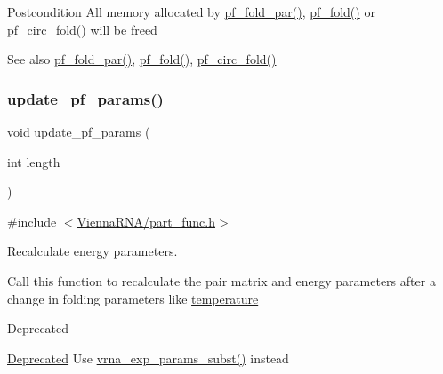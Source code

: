 \begin{DoxyPostcond}{Postcondition}
All memory allocated by \hyperlink{group__pf__fold_gac4f95bee734b2563a3d6e9932117ebdf}{pf\+\_\+fold\+\_\+par()}, \hyperlink{group__pf__fold_gadc3db3d98742427e7001a7fd36ef28c2}{pf\+\_\+fold()} or \hyperlink{group__pf__fold_ga819ce5fca8984004ac81c4a3b04cb735}{pf\+\_\+circ\+\_\+fold()} will be free\textquotesingle{}d 
\end{DoxyPostcond}
\begin{DoxySeeAlso}{See also}
\hyperlink{group__pf__fold_gac4f95bee734b2563a3d6e9932117ebdf}{pf\+\_\+fold\+\_\+par()}, \hyperlink{group__pf__fold_gadc3db3d98742427e7001a7fd36ef28c2}{pf\+\_\+fold()}, \hyperlink{group__pf__fold_ga819ce5fca8984004ac81c4a3b04cb735}{pf\+\_\+circ\+\_\+fold()} 
\end{DoxySeeAlso}
\mbox{\label{group__pf__fold_ga384e927890f9c034ff09fa66da102d28}} 
\subsubsection{\texorpdfstring{update\+\_\+pf\+\_\+params()}{update\_pf\_params()}}
{\footnotesize\ttfamily void update\+\_\+pf\+\_\+params (\begin{DoxyParamCaption}\item[{int}]{length }\end{DoxyParamCaption})}



{\ttfamily \#include $<$\hyperlink{part__func_8h}{Vienna\+R\+N\+A/part\+\_\+func.\+h}$>$}



Recalculate energy parameters. 

Call this function to recalculate the pair matrix and energy parameters after a change in folding parameters like \hyperlink{group__model__details_gab4b11c8d9c758430960896bc3fe82ead}{temperature}

\begin{DoxyRefDesc}{Deprecated}
\item[\hyperlink{deprecated__deprecated000107}{Deprecated}]Use \hyperlink{group__energy__parameters_ga8e7ac4fab3b0cc03afbc134eaafb3525}{vrna\+\_\+exp\+\_\+params\+\_\+subst()} instead\end{DoxyRefDesc}
\mbox{\label{group__pf__fold_gaafe2d1b21f5418b123b088aa395e827d}} 
